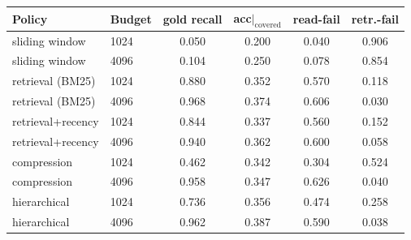 \begin{tabular}{llcccc}
\toprule
Policy & Budget & gold recall & acc$|_{\mathrm{covered}}$ & read-fail & retr.-fail \\
\midrule
sliding window & 1024 & 0.050 & 0.200 & 0.040 & 0.906 \\
sliding window & 4096 & 0.104 & 0.250 & 0.078 & 0.854 \\
retrieval (BM25) & 1024 & 0.880 & 0.352 & 0.570 & 0.118 \\
retrieval (BM25) & 4096 & 0.968 & 0.374 & 0.606 & 0.030 \\
retrieval+recency & 1024 & 0.844 & 0.337 & 0.560 & 0.152 \\
retrieval+recency & 4096 & 0.940 & 0.362 & 0.600 & 0.058 \\
compression & 1024 & 0.462 & 0.342 & 0.304 & 0.524 \\
compression & 4096 & 0.958 & 0.347 & 0.626 & 0.040 \\
hierarchical & 1024 & 0.736 & 0.356 & 0.474 & 0.258 \\
hierarchical & 4096 & 0.962 & 0.387 & 0.590 & 0.038 \\
\bottomrule
\end{tabular}